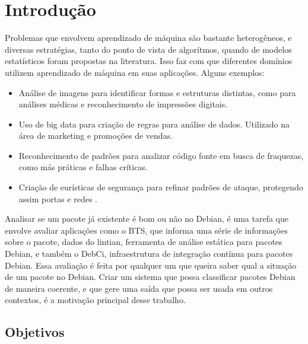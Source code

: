 \chapter*[Introdução]{Introdução}

Problemas que envolvem aprendizado de máquina são bastante heterogêneos, e diversas estratégias, tanto do ponto de vista de algorítmos, quando de modelos estatísticos foram propostas na literatura. Isso faz com que diferentes domínios utilizem aprendizado de máquina
em suas aplicações. Alguns exemplos:

\begin{itemize}
\item Análise de imagens para identificar formas e estruturas distintas, como para análises médicas e reconhecimento de impressões digitais\cite{Louridas}.

\item Uso de big data para criação de regras para análise de dados. Utilizado na área de marketing e promoções de vendas\cite{Louridas}.

\item Reconhecimento de padrões para analizar código fonte em busca de fraquezas, como más práticas e falhas críticas\cite{Louridas}.

\item Criação de eurísticas de segurança para refinar padrões de ataque, protegendo assim portas e redes \cite{Louridas}.
\end{itemize}



        Analisar se um pacote já existente é bom ou não no Debian, é uma tarefa que envolve avaliar aplicações como o BTS, que informa uma série de informações sobre o pacote, dados do lintian, ferramenta de análise estática para pacotes Debian, e também o DebCi, infraestrutura de integração contínua para pacotes Debian. Essa avaliação é feita por qualquer um que queira saber qual a situação de um pacote no Debian. Criar um sistema que possa classificar pacotes Debian de maneira coerente, e que gere uma saída que possa ser usada em outros contextos, é a motivação principal desse trabalho.

\section{Objetivos}

